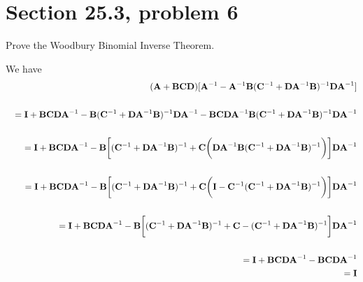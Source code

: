 \section{Section 25.3, problem 6}
Prove the Woodbury Binomial Inverse Theorem.

\bigskip
\noindent
We have
\begin{eqnarray*}
&&({\bf A}+{\bf BCD})[{\bf A}^{-1}-{\bf A}^{-1}{\bf B}({\bf C}^{-1}+{\bf D}{\bf A}^{-1}{\bf B})^{-1}{\bf DA}^{-1}]\\
\\
&&={\bf I}+{\bf BCDA}^{-1}
-{\bf B}({\bf C}^{-1}+{\bf D}{\bf A}^{-1}{\bf B})^{-1}{\bf DA}^{-1}
-{\bf BCDA}^{-1}{\bf B}({\bf C}^{-1}+{\bf D}{\bf A}^{-1}{\bf B})^{-1}{\bf DA}^{-1}\\
\\
&&={\bf I}+{\bf BCDA}^{-1}-{\bf B}\bigg[({\bf C}^{-1}+{\bf DA}^{-1}{\bf B})^{-1}+{\bf C}\bigg({\bf DA}^{-1}{\bf B}({\bf C}^{-1}+{\bf DA}^{-1}{\bf B})^{-1}\bigg)\bigg]{\bf DA}^{-1}\\
\\
&&={\bf I}+{\bf BCDA}^{-1}-{\bf B}\bigg[({\bf C}^{-1}+{\bf DA}^{-1}{\bf B})^{-1}
+{\bf C}\bigg({\bf I}-{\bf C}^{-1}({\bf C}^{-1}+{\bf DA}^{-1}{\bf B})^{-1}\bigg)\bigg]{\bf DA}^{-1}\\
\\
&&={\bf I}+{\bf BCDA}^{-1}-{\bf B}\bigg[({\bf C}^{-1}+{\bf DA}^{-1}{\bf B})^{-1}+{\bf C}-({\bf C}^{-1}+{\bf DA}^{-1}{\bf B})^{-1}\bigg]{\bf DA}^{-1}\\
\\
&&={\bf I}+{\bf BCDA}^{-1}-{\bf BCDA}^{-1}\\
&&={\bf I}
\end{eqnarray*}
